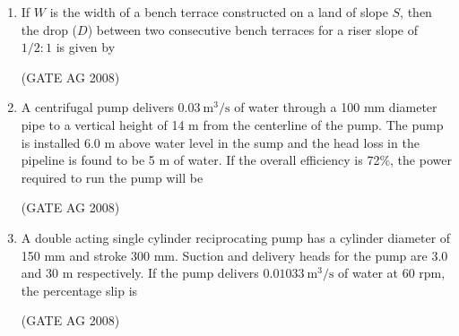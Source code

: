 \documentclass[journal]{IEEEtran}
\begin{document}
\begin{enumerate}
\medskip

\item 
 If $W$ is the width of a bench terrace constructed on a land of slope $S$, then the drop ($D$) between two consecutive bench terraces for a riser slope of $1/2 : 1$ is given by
\begin{enumerate}
\end{enumerate}
\hfill(GATE AG 2008)\\

\medskip

\item 
 A centrifugal pump delivers $0.03\ \text{m}^3/\text{s}$ of water through a 100 mm diameter pipe to a vertical height of 14 m from the centerline of the pump. The pump is installed 6.0 m above water level in the sump and the head loss in the pipeline is found to be 5 m of water. If the overall efficiency is 72\%, the power required to run the pump will be
\begin{enumerate}
\end{enumerate}
\hfill(GATE AG 2008)\\

\medskip

\item 
 A double acting single cylinder reciprocating pump has a cylinder diameter of 150 mm and stroke 300 mm. Suction and delivery heads for the pump are 3.0 and 30 m respectively. If the pump delivers $0.01033\ \text{m}^3/\text{s}$ of water at 60 rpm, the percentage slip is
\begin{enumerate}
\end{enumerate}
\hfill(GATE AG 2008)\\


\end{enumerate}
\end{document}

